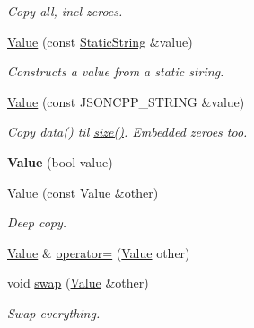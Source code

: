 \begin{DoxyCompactItemize}
\begin{DoxyCompactList}\small\item\em Copy all, incl zeroes. \end{DoxyCompactList}\item 
\hyperlink{classJson_1_1Value_a081830e95f88a37054da7e46c65b0766}{Value} (const \hyperlink{classJson_1_1StaticString}{Static\+String} \&value)
\begin{DoxyCompactList}\small\item\em Constructs a value from a static string. \end{DoxyCompactList}\item 
\mbox{\label{classJson_1_1Value_a89ef37969ff7c6eb3a7afcca03d4cd4a}} 
\hyperlink{classJson_1_1Value_a89ef37969ff7c6eb3a7afcca03d4cd4a}{Value} (const J\+S\+O\+N\+C\+P\+P\+\_\+\+S\+T\+R\+I\+NG \&value)
\begin{DoxyCompactList}\small\item\em Copy data() til \hyperlink{classJson_1_1Value_a0ec2808e1d7efa4e9fad938d6667be44}{size()}. Embedded zeroes too. \end{DoxyCompactList}\item 
\mbox{\label{classJson_1_1Value_a350a31ea4a30d384994b0bc010b17495}} 
{\bfseries Value} (bool value)
\item 
\mbox{\label{classJson_1_1Value_a436dfd3670f95fd665f680eba5cebcf0}} 
\hyperlink{classJson_1_1Value_a436dfd3670f95fd665f680eba5cebcf0}{Value} (const \hyperlink{classJson_1_1Value}{Value} \&other)
\begin{DoxyCompactList}\small\item\em Deep copy. \end{DoxyCompactList}\item 
\hyperlink{classJson_1_1Value}{Value} \& \hyperlink{classJson_1_1Value_a795acb28772da4c5d85ae8f4af36c69f}{operator=} (\hyperlink{classJson_1_1Value}{Value} other)
\item 
\mbox{\label{classJson_1_1Value_aab841120d78e296e1bc06a373345e822}} 
void \hyperlink{classJson_1_1Value_aab841120d78e296e1bc06a373345e822}{swap} (\hyperlink{classJson_1_1Value}{Value} \&other)
\begin{DoxyCompactList}\small\item\em Swap everything. \end{DoxyCompactList}\item 

\end{DoxyCompactItemize}
